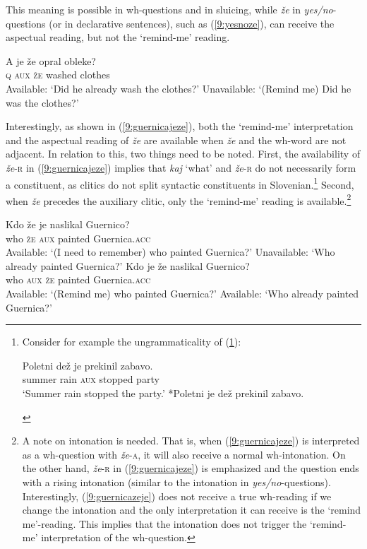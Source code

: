 \documentclass[output=paper,
modfonts,
newtxmath,
hidelinks
]{langscibook}
\begin{document}
\noindent This meaning is possible in wh-questions and in sluicing, while \textit{že} in \textit{yes/no}-questions (or in declarative sentences), such as (\ref{9:yesnoze}), can receive the aspectual reading, but not the `remind-me' reading. 

\begin{exe}
\ex \label{9:yesnoze}
\gll A je že opral obleke?\\
	\textsc{q} \textsc{aux} \textsc{že} washed clothes\\
	\glt Available: `Did he already wash the clothes?'
\glt Unavailable: `(Remind me) Did he was the clothes?'
\end{exe}

\noindent Interestingly, as shown in (\ref{9:guernicajeze}), both the `remind-me' interpretation and the aspectual reading of \textit{že} are available when \textit{že} and the wh-word are not adjacent. In relation to this, two things need to be noted. First, the availability of \textit{že}-\textsc{r} in (\ref{9:guernicajeze}) implies that \textit{kaj} `what' and \textit{že}-\textsc{r} do not necessarily form a constituent, as clitics do not split syntactic constituents in Slovenian.\footnote{Consider for example the ungrammaticality of (\ref{9:ib}):
\ea
\begin{xlista}
\ex
{
\gll	Poletni dež je prekinil zabavo.\\
 summer rain \textsc{aux} stopped party\\
\trans `Summer rain stopped the party.' 
}
\ex
{
 *Poletni je dež prekinil zabavo.
}
\label{9:ib}
\end{xlista}
\zlast} 
Second, when \textit{že} precedes the auxiliary clitic, only the `remind-me' reading is available.\footnote{A note on intonation is needed. That is, when (\ref{9:guernicajeze}) is interpreted as a wh-question with \textit{že}-\textsc{a}, it will also receive a normal wh-intonation. On the other hand, \textit{že}-\textsc{r} in (\ref{9:guernicajeze}) is emphasized and the question ends with a rising intonation (similar to the intonation in \textit{yes/no}-questions). Interestingly, (\ref{9:guernicazeje}) does not receive a true wh-reading if we change the intonation and the only interpretation it can receive is the `remind me'-reading. This implies that the intonation does not trigger the `remind-me' interpretation of the wh-question.} 

\begin{exe}
\ex 
\begin{xlist}
\ex \label{9:guernicazeje}
\gll Kdo že je naslikal Guernico? \\
		who \textsc{že} \textsc{aux} painted Guernica.\textsc{acc}\\
\trans  Available: `(I need to remember) who painted Guernica?'
\trans Unavailable: `Who already painted Guernica?'
\ex \label{9:guernicajeze}
\gll	Kdo je že naslikal Guernico?\\
		who \textsc{aux} \textsc{že} painted Guernica.\textsc{acc}\\
\trans	 Available: `(Remind me) who painted Guernica?'
\trans 	 Available: `Who already painted Guernica?'
\end{xlist}
\end{exe}
\end{document}
